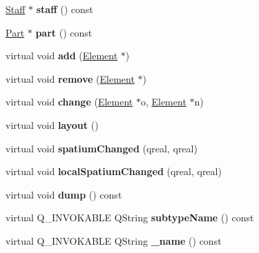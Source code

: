 \begin{DoxyCompactItemize}
\hyperlink{class_ms_1_1_staff}{Staff} $\ast$ {\bfseries staff} () const
\item 
\mbox{\label{class_ms_1_1_element_a0049832d4191b3ce02446efa09127610}} 
\hyperlink{class_ms_1_1_part}{Part} $\ast$ {\bfseries part} () const
\item 
\mbox{\label{class_ms_1_1_element_a6466e3a3ada3e0e7add1d1977bbfda96}} 
virtual void {\bfseries add} (\hyperlink{class_ms_1_1_element}{Element} $\ast$)
\item 
\mbox{\label{class_ms_1_1_element_acca1fd58c4df74da5cefc31787a2c715}} 
virtual void {\bfseries remove} (\hyperlink{class_ms_1_1_element}{Element} $\ast$)
\item 
\mbox{\label{class_ms_1_1_element_a6b065b12b8c1a8549b2a5f96394059af}} 
virtual void {\bfseries change} (\hyperlink{class_ms_1_1_element}{Element} $\ast$o, \hyperlink{class_ms_1_1_element}{Element} $\ast$n)
\item 
\mbox{\label{class_ms_1_1_element_a3ae68f5da280c53fd1d329f20601818b}} 
virtual void {\bfseries layout} ()
\item 
\mbox{\label{class_ms_1_1_element_a8198d208370c064154b2be113981cbda}} 
virtual void {\bfseries spatium\+Changed} (qreal, qreal)
\item 
\mbox{\label{class_ms_1_1_element_a904f7cbd2d6c478e10a6e7d7ae9f638d}} 
virtual void {\bfseries local\+Spatium\+Changed} (qreal, qreal)
\item 
\mbox{\label{class_ms_1_1_element_a6392770f67e4c8dee01c324f63d5fcd7}} 
virtual void {\bfseries dump} () const
\item 
\mbox{\label{class_ms_1_1_element_a861aa05fa45296c04d4309143211a9e6}} 
virtual Q\+\_\+\+I\+N\+V\+O\+K\+A\+B\+LE Q\+String {\bfseries subtype\+Name} () const
\item 
\mbox{\label{class_ms_1_1_element_a24960cc1b17ecdef26c9e2e51f8778f4}} 
virtual Q\+\_\+\+I\+N\+V\+O\+K\+A\+B\+LE Q\+String {\bfseries \+\_\+name} () const

\end{DoxyCompactItemize}
